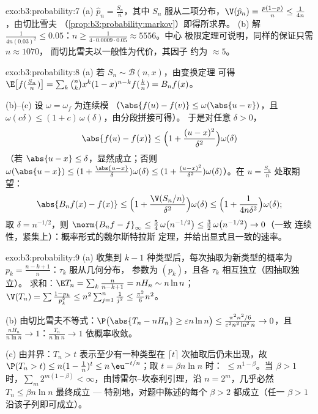 \begin{solution}{exo:b3:probability:7}
(a) $\hat p_n = \frac{S_n}n$，其中 $S_n$ 服从二项分布，$\V(\hat
p_n) = \frac{p(1-p)}n \leq \frac1{4n}$，由切比雪夫
（\cref{prop:b3:probability:markov}）即得所求界。
(b) 解 $\frac1{4n(0.03)^2} \leq 0.05$：$n \geq
\frac{1}{4\cdot0.0009\cdot0.05} \approx 5556$。中心
极限定理可说明，同样的保证只需 $n \approx 1070$，
而切比雪夫以一般性为代价，其因子
约为 $\approx 5$。
\end{solution}

\begin{solution}{exo:b3:probability:8}
(a) 若 $S_n \sim \mathcal B(n, x)$，由变换定理
可得 $\E\bigl[f(\frac{S_n}n)\bigr] =
\sum_k\binom nkx^k(1-x)^{n-k}f(\frac kn) = B_nf(x)$。

(b)--(c) 设 $\omega = \omega_f$ 为连续模
（$\abs{f(u) - f(v)} \leq \omega(\abs{u - v})$，且 $\omega(c
\delta) \leq (1 + c)\,\omega(\delta)$，由分段拼接可得）。
于是对任意 $\delta > 0$，
\[
\abs{f(u) - f(x)} \leq \Bigl(1 + \frac{(u -
x)^2}{\delta^2}\Bigr)\omega(\delta)
\]
（若 $\abs{u - x} \leq \delta$，显然成立；否则
$\omega(\abs{u-x}) \leq (1 + \frac{\abs{u-x}}\delta)
\omega(\delta) \leq (1 + \frac{(u-x)^2}{\delta^2})
\omega(\delta)$）。在 $u = \frac{S_n}n$ 处取期望：
\[
\abs{B_nf(x) - f(x)} \leq
\Bigl(1 + \frac{\V(S_n/n)}{\delta^2}\Bigr)\omega(\delta)
\leq \Bigl(1 + \frac{1}{4n\delta^2}\Bigr)\omega(\delta) ;
\]
取 $\delta = n^{-1/2}$，则 $\norm{B_nf - f}_\infty \leq
\frac54\,\omega\bigl(n^{-1/2}\bigr) \leq
\frac32\,\omega\bigl(n^{-1/2}\bigr) \to 0$（一致
连续性，紧集上）：概率形式的魏尔斯特拉斯
定理，并给出显式且一致的速率。
\end{solution}

\begin{solution}{exo:b3:probability:9}
(a) 收集到 $k - 1$ 种类型后，每次抽取为新类型的概率为
$p_k = \frac{n-k+1}n$：$\tau_k$ 服从几何分布，
参数为 $(p_k)$，且各 $\tau_k$ 相互独立（因抽取独立）。
求和：$\E T_n = \sum_k\frac n{n-k+1} = nH_n \sim n\ln n$；
$\V(T_n) = \sum\frac{1 - p_k}{p_k^2} \leq
n^2\sum_{j=1}^n\frac1{j^2} \leq \frac{\pi^2}6n^2$。

(b) 由切比雪夫不等式：$\P\bigl(\abs{T_n - nH_n} \geq \varepsilon
n\ln n\bigr) \leq \frac{\pi^2n^2/6}{\varepsilon^2n^2\ln^2n}
\to 0$，且 $\frac{nH_n}{n\ln n} \to 1$：$\frac{T_n}{n\ln n}
\to 1$ 依概率收敛。

(c) 由并界：$T_n > t$ 表示至少有一种类型在
$\lceil t\rceil$ 次抽取后仍未出现，故 $\P(T_n > t) \leq n(1 -
\frac1n)^{t} \leq n\,\eu^{-t/n}$；取 $t = \beta n\ln n$ 时：
$\leq n^{1 - \beta}$。当 $\beta > 1$ 时，$\sum_m
2^{m(1-\beta)} < \infty$，由博雷尔–坎泰利引理，沿 $n =
2^m$，几乎必然 $T_n \leq \beta n\ln n$ 最终成立 ---
特别地，对题中陈述的每个 $\beta > 2$ 都成立（任一 $\beta > 1$
沿该子列即可成立）。
\end{solution}


